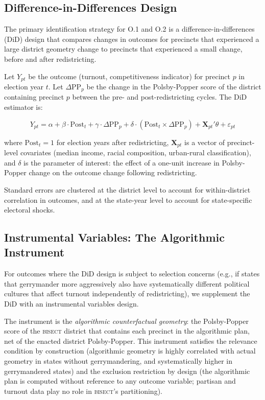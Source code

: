 \subsection{Difference-in-Differences Design}

The primary identification strategy for O.1 and O.2 is a difference-in-differences (DiD)
design that compares changes in outcomes for precincts that experienced a large district
geometry change to precincts that experienced a small change, before and after redistricting.

Let $Y_{pt}$ be the outcome (turnout, competitiveness indicator) for precinct $p$ in
election year $t$. Let $\Delta\text{PP}_{p}$ be the change in the Polsby-Popper score
of the district containing precinct $p$ between the pre- and post-redistricting cycles.
The DiD estimator is:

\begin{equation}
Y_{pt} = \alpha + \beta \cdot \text{Post}_t + \gamma \cdot \Delta\text{PP}_p
  + \delta \cdot (\text{Post}_t \times \Delta\text{PP}_p) + \mathbf{X}_{pt}'\theta + \varepsilon_{pt}
\end{equation}

where $\text{Post}_t = 1$ for election years after redistricting, $\mathbf{X}_{pt}$ is
a vector of precinct-level covariates (median income, racial composition, urban-rural
classification), and $\delta$ is the parameter of interest: the effect of a one-unit
increase in Polsby-Popper change on the outcome change following redistricting.

Standard errors are clustered at the district level to account for within-district
correlation in outcomes, and at the state-year level to account for state-specific
electoral shocks.

\subsection{Instrumental Variables: The Algorithmic Instrument}

For outcomes where the DiD design is subject to selection concerns (e.g., if states
that gerrymander more aggressively also have systematically different political cultures
that affect turnout independently of redistricting), we supplement the DiD with an
instrumental variables design.

The instrument is the \textit{algorithmic counterfactual geometry}: the Polsby-Popper
score of the \textsc{bisect} district that contains each precinct in the algorithmic
plan, net of the enacted district Polsby-Popper. This instrument satisfies the
relevance condition by construction (algorithmic geometry is highly correlated with
actual geometry in states without gerrymandering, and systematically higher in
gerrymandered states) and the exclusion restriction by design (the algorithmic plan
is computed without reference to any outcome variable; partisan and turnout data
play no role in \textsc{bisect}'s partitioning).

